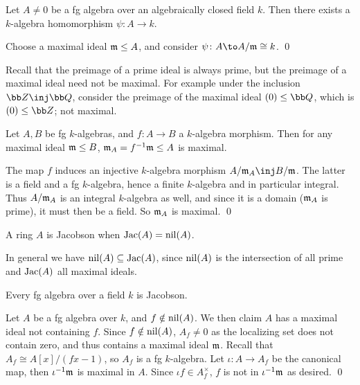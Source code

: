 \eproof

\bcoro

    Let $A\neq0$ be a fg algebra over an algebraically closed field $k$.
    Then there exists a $k$-algebra homomorphism $\psi\colon A\to k$.

\ecoro

\bproof

    Choose a maximal ideal ${{\frak m}}\leq A$, and consider $\psi\colon A\to A/\m\cong k$.
    \qed

\eproof

Recall that the preimage of a prime ideal is always prime, but the preimage of a maximal ideal need not be maximal.
For example under the inclusion $\bZ\inj\bQ$, consider the preimage of the maximal ideal $(0)\leq\bQ$, which is $(0)\leq\bZ$; not maximal.

\bprop

    Let $A,B$ be fg $k$-algebras, and $f\colon A\to B$ a $k$-algebra morphism.
    Then for any maximal ideal ${{\frak m}}\leq B$, ${{\frak m}}_A=f^{-1}{{\frak m}}\leq A$ is maximal.

\eprop

\bproof

    The map $f$ induces an injective $k$-algebra morphism $A/\m_A\inj B/\m$.
    The latter is a field and a fg $k$-algebra, hence a finite $k$-algebra and in particular integral.
    Thus $A/{{\frak m}}_A$ is an integral $k$-algebra as well, and since it is a domain (${{\frak m}}_A$ is prime), it must then be a field.
    So ${{\frak m}}_A$ is maximal.
    \qed

\eproof

\bdefn

    A ring $A$ is {\emphcolor Jacobson} when ${\rm Jac}(A)={\rm nil}(A)$.

\edefn

In general we have ${\rm nil}(A)\subseteq{\rm Jac}(A)$, since ${\rm nil}(A)$ is the intersection of all prime and ${\rm Jac}(A)$ all maximal ideals.

\bprop

    Every fg algebra over a field $k$ is Jacobson.

\eprop

\bproof

    Let $A$ be a fg algebra over $k$, and $f\notin{\rm nil}(A)$.
    We then claim $A$ has a maximal ideal not containing $f$.
    Since $f\notin{\rm nil}(A)$, $A_f\neq0$ as the localizing set does not contain zero, and thus contains a maximal ideal ${{\frak m}}$.
    Recall that $A_f\cong A[x]/(fx-1)$, so $A_f$ is a fg $k$-algebra.
    Let $\iota\colon A\to A_f$ be the canonical map, then $\iota^{-1}{{\frak m}}$ is maximal in $A$.
    Since $\iota f\in A_f^\times$, $f$ is not in $\iota^{-1}{{\frak m}}$ as desired.
    \qed

